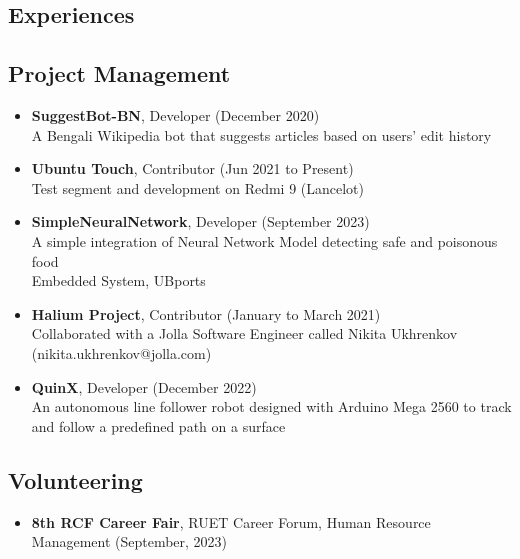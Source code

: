\documentclass{article}
\begin{document}
\begin{adjustwidth}{0cm}{0cm}
\begin{multicols}{2}
        \section*{Experiences}
        \subsection*{Project Management}
        \begin{itemize}
            \item \textbf{SuggestBot-BN}, Developer (December 2020)\\
                  A Bengali Wikipedia bot that suggests articles based on users' edit history
            \item \textbf{Ubuntu Touch}, Contributor (Jun 2021 to Present)\\
                  Test segment and development on Redmi 9 (Lancelot)
            \item \textbf{SimpleNeuralNetwork}, Developer (September 2023)\\
                  A simple integration of Neural Network Model detecting safe and poisonous food\\
                  Embedded System, UBports
            \item \textbf{Halium Project}, Contributor (January to March 2021)\\
                  Collaborated with a Jolla Software Engineer called Nikita Ukhrenkov (nikita.ukhrenkov@jolla.com)
            \item \textbf{QuinX}, Developer (December 2022)\\
                  An autonomous line follower robot designed with Arduino Mega 2560 to track and follow a predefined path on a surface
        \end{itemize}

        \subsection*{Volunteering}
        \begin{itemize}
            \item \textbf{8th RCF Career Fair}, RUET Career Forum, Human Resource Management (September, 2023)
        \end{itemize}


\end{multicols}
\end{adjustwidth}
\end{document}
